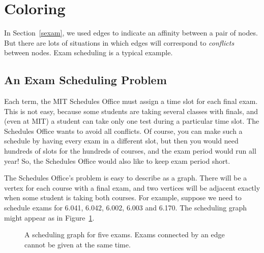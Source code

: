 
\begin{problems}
\classproblems
{}

\examproblems
{}

\homeworkproblems
{}
\end{problems}

\section{Coloring}\label{sec:coloring}

In Section~\ref{sexam}, we used edges to indicate an affinity between a
pair of nodes.  But there are lots of situations in which edges will
correspond to \emph{conflicts} between nodes.  Exam scheduling is a
typical example.

\subsection{An Exam Scheduling Problem}

Each term, the MIT Schedules Office must assign a time slot for each
final exam.  This is not easy, because some students are taking
several classes with finals, and (even at MIT) a student can take only
one test during a particular time slot.  The Schedules Office wants to
avoid all conflicts.  Of course, you can make such a schedule by
having every exam in a different slot, but then you would need
hundreds of slots for the hundreds of courses, and the exam period
would run all year!  So, the Schedules Office would also like to keep
exam period short.

The Schedules Office's problem is easy to describe as a graph.  There
will be a vertex for each course with a final exam, and two vertices
will be adjacent exactly when some student is taking both courses.
For example, suppose we need to schedule exams for 6.041, 6.042,
6.002, 6.003 and 6.170.  The scheduling graph might appear as in
Figure~\ref{fig:5R}.

\begin{figure}


\caption{A scheduling graph for five exams.  Exams connected by an
  edge cannot be given at the same time.}

\label{fig:5R}

\end{figure}

